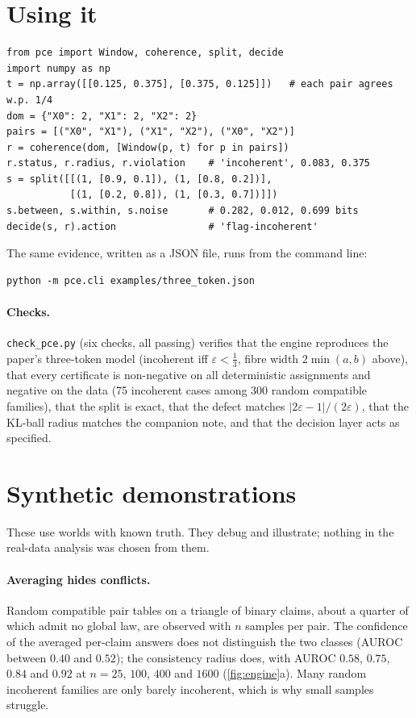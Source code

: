 \documentclass[11pt]{article}
\theoremstyle{definition}\newtheorem{definition}{Definition}
\begin{document}
\section{Using it}
\begin{lstlisting}
from pce import Window, coherence, split, decide
import numpy as np
t = np.array([[0.125, 0.375], [0.375, 0.125]])   # each pair agrees w.p. 1/4
dom = {"X0": 2, "X1": 2, "X2": 2}
pairs = [("X0", "X1"), ("X1", "X2"), ("X0", "X2")]
r = coherence(dom, [Window(p, t) for p in pairs])
r.status, r.radius, r.violation    # 'incoherent', 0.083, 0.375
s = split([[(1, [0.9, 0.1]), (1, [0.8, 0.2])],
           [(1, [0.2, 0.8]), (1, [0.3, 0.7])]])
s.between, s.within, s.noise       # 0.282, 0.012, 0.699 bits
decide(s, r).action                # 'flag-incoherent'
\end{lstlisting}
The same evidence, written as a JSON file, runs from the command line:
\begin{lstlisting}
python -m pce.cli examples/three_token.json
\end{lstlisting}

\paragraph{Checks.} \texttt{check\_pce.py} (six checks, all passing) verifies that the engine reproduces the paper's three-token
model (incoherent iff $\varepsilon<\tfrac13$, fibre width $2\min(a,b)$ above), that every certificate is non-negative on all
deterministic assignments and negative on the data (75 incoherent cases among 300 random compatible families), that the split is exact,
that the defect matches $|2\varepsilon-1|/(2\varepsilon)$, that the KL-ball radius matches the companion note, and that the decision
layer acts as specified.

\section{Synthetic demonstrations}
These use worlds with known truth. They debug and illustrate; nothing in the real-data analysis was chosen from them.

\paragraph{Averaging hides conflicts.} Random compatible pair tables on a triangle of binary claims, about a quarter of which admit no
global law, are observed with $n$ samples per pair. The confidence of the averaged per-claim answers does not distinguish the two
classes (AUROC between $0.40$ and $0.52$); the consistency radius does, with AUROC $0.58$, $0.75$, $0.84$ and $0.92$ at $n=25$, $100$,
$400$ and $1600$ (\cref{fig:engine}a). Many random incoherent families are only barely incoherent, which is why small samples struggle.
\end{document}
